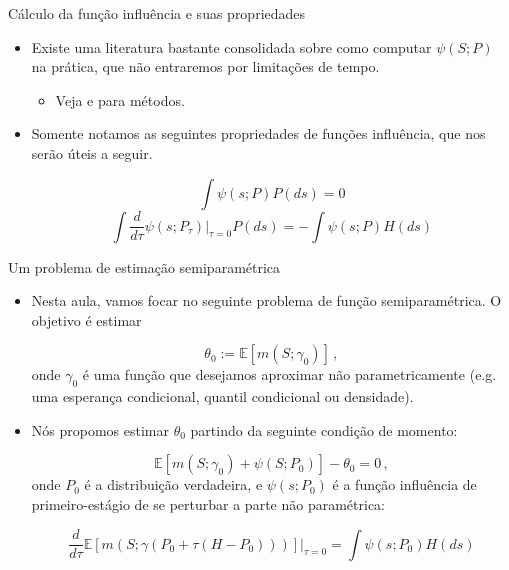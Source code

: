 \documentclass[11pt]{beamer}
\begin{document}
\begin{frame}{Cálculo da função influência e suas propriedades}
\begin{itemize}
	\item 	Existe uma literatura bastante consolidada sobre como computar $\psi(S;P)$ na prática, que não entraremos por limitações de tempo.
	\begin{itemize}
		\item Veja \citet{Ichimura2022} e \citet{kennedy2023semiparametric} para métodos.
	\end{itemize}
	\item Somente notamos as seguintes propriedades de funções influência, que nos serão úteis a seguir.
	
	$$\int \psi(s;P) P(ds) = 0$$
	$$\int \frac{d}{d \tau}\psi(s;P_\tau)\Big|_{\tau = 0} P(ds) = - \int \psi(s;P) H(ds) $$
\end{itemize}
\end{frame}

\begin{frame}{Um problema de estimação semiparamétrica}
\begin{itemize}
	\item Nesta aula, vamos focar no seguinte problema de função semiparamétrica. O objetivo é estimar
	
	$$\theta_0 := \mathbb{E}[m(S;\gamma_0)]\,,$$
	onde $\gamma_0$ é uma função que desejamos aproximar não parametricamente (e.g. uma esperança condicional, quantil condicional ou densidade).
	
	\item Nós propomos estimar $\theta_0$ partindo da seguinte condição de momento:
	
	$$ \mathbb{E}[m(S;\gamma_0) + \psi(S;P_0)] - \theta_0 = 0\,,$$
	onde $P_0$ é a distribuição verdadeira, e $\psi(s;P_0)$ é a {\color{blue}função influência de primeiro-estágio} de se perturbar a parte não paramétrica:
	
	$$\frac{d}{d \tau}\mathbb{E}[m(S;\gamma(P_0+\tau (H-P_0)))]\Big|_{\tau=0} = \int \psi(s;P_0)H(ds)$$
	
\end{itemize}
\end{frame}
\end{document}
